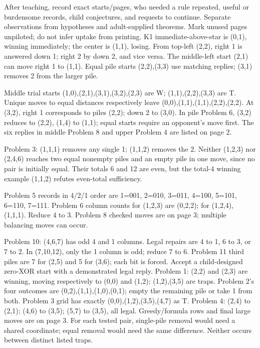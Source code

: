 \documentclass[11pt]{article}
\begin{document}
After teaching, record exact starts/pages, who needed a rule repeated, useful or burdensome records, child conjectures, and requests to continue. Separate observations from hypotheses and adult-supplied theorems. Mark unused pages unpiloted; do not infer uptake from printing.
\newpage
{}
K1 immediate-above-star is (0,1), winning immediately; the center is (1,1), losing. From top-left (2,2), right 1 is answered down 1; right 2 by down 2, and vice versa. The middle-left start (2,1) can move right 1 to (1,1). Equal pile starts (2,2),(3,3) use matching replies; (3,1) removes 2 from the larger pile.

Middle trial starts (1,0),(2,1),(3,1),(3,2),(2,3) are W; (1,1),(2,2),(3,3) are T. Unique moves to equal distances respectively leave (0,0),(1,1),(1,1),(2,2),(2,2). At (3,2), right 1 corresponds to piles (2,2); down 2 to (3,0). In pile Problem 6, (3,2) reduces to (2,2), (1,4) to (1,1); equal starts require an opponent's move first. The six replies in middle Problem 8 and upper Problem 4 are listed on page 2.

Problem 3: (1,1,1) removes any single 1; (1,1,2) removes the 2. Neither (1,2,3) nor (2,4,6) reaches two equal nonempty piles and an empty pile in one move, since no pair is initially equal. Their totals 6 and 12 are even, but the total-4 winning example (1,1,2) refutes even-total sufficiency.

Problem 5 records in 4/2/1 order are 1=001, 2=010, 3=011, 4=100, 5=101, 6=110, 7=111. Problem 6 column counts for (1,2,3) are (0,2,2); for (1,2,4), (1,1,1). Reduce 4 to 3. Problem 8 checked moves are on page 3; multiple balancing moves can occur.

Problem 10: (4,6,7) has odd 4 and 1 columns. Legal repairs are 4 to 1, 6 to 3, or 7 to 2. In (7,10,12), only the 1 column is odd; reduce 7 to 6. Problem 11 third piles are 7 for (2,5) and 5 for (3,6); each bit is forced. Accept a child-designed zero-XOR start with a demonstrated legal reply.
Problem 1: (2,2) and (2,3) are winning, moving respectively to (0,0) and (1,2); (1,2),(3,5) are traps. Problem 2's four outcomes are (0,2),(1,1),(1,0),(0,1); empty the remaining pile or take 1 from both. Problem 3 grid has exactly (0,0),(1,2),(3,5),(4,7) as T. Problem 4: (2,4) to (2,1); (4,6) to (3,5); (5,7) to (3,5), all legal. Greedy/formula rows and final large moves are on page 3. For each tested pair, single-pile removal would need a shared coordinate; equal removal would need the same difference. Neither occurs between distinct listed traps.
\end{document}
